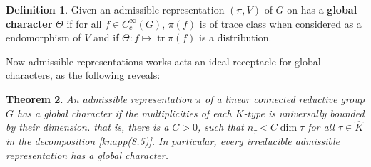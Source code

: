 \documentclass[11pt]{report}
\theoremstyle{definition}
\newtheorem{Def}{Definition}[chapter]
\theoremstyle{plain}
\newtheorem{Theo}[Def]{Theorem}
\DeclareMathOperator{\tr}{tr}
\renewcommand{\hat}{\widehat}
\begin{document}
\begin{Def}
	Given an admissible representation $(\pi,V)$ of $G$ on has a \textbf{global character} $\Theta$ if for all $ f\in C^\infty_c(G)$, $\pi(f)$ is of trace class when considered as a endomorphism of $V$ and if $\Theta: f\mapsto \tr\pi(f)$ is a distribution.
\end{Def} 
Now admissible representations works acts an ideal receptacle for global characters, as the following reveals:
\begin{Theo}
	\textnormal{\cite[Theorem~10.2]{knapp2016}} An admissible representation $\pi$ of a linear connected reductive group $G$ has a global character if the multiplicities of each $K$-type is universally bounded by their dimension. that is, there is a $C>0$, such that $n_\tau<C\dim \tau$ for all $\tau\in \hat{K}$ in the decomposition \ref{knapp(8.5)}. In particular, every irreducible admissible representation has a global character.
\end{Theo}
\end{document}
